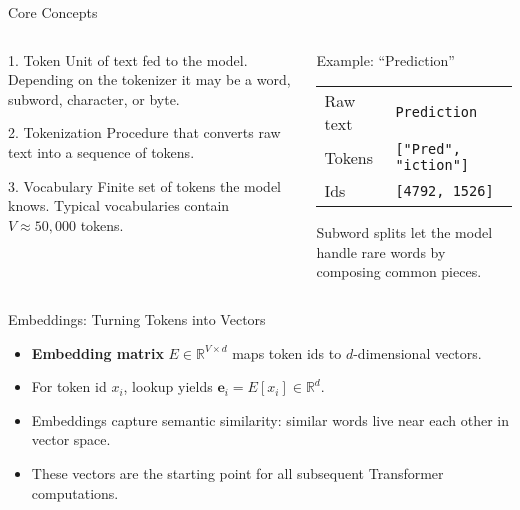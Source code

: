 \documentclass[aspectratio=169]{beamer}
\begin{document}
\begin{frame}{Core Concepts}
  \begin{columns}[T,onlytextwidth]
    \begin{column}{0.53\linewidth}
      \begin{block}{1. Token}
        Unit of text fed to the model. Depending on the tokenizer it may be a word, subword, character, or byte.
      \end{block}
      \begin{block}{2. Tokenization}
        Procedure that converts raw text into a sequence of tokens. 
      \end{block}
      \begin{block}{3. Vocabulary}
        Finite set of tokens the model knows. Typical vocabularies contain $V \approx 50{,}000$ tokens.
      \end{block}
    \end{column}
    \begin{column}{0.42\linewidth}
      \begin{exampleblock}{Example: ``Prediction''}
        \begin{tabular}{@{}ll@{}}
          Raw text & \texttt{Prediction} \\
          Tokens & \texttt{["Pred", "iction"]} \\
          Ids & \texttt{[4792, 1526]} \\
        \end{tabular}
        Subword splits let the model handle rare words by composing common pieces.
      \end{exampleblock}
    \end{column}
  \end{columns}
\end{frame}

\begin{frame}{Embeddings: Turning Tokens into Vectors}
  \begin{itemize}
    \item \textbf{Embedding matrix} $E \in \mathbb{R}^{V \times d}$ maps token ids to $d$-dimensional vectors.
    \item For token id $x_i$, lookup yields $\mathbf{e}_i = E[x_i] \in \mathbb{R}^d$.
    \item Embeddings capture semantic similarity: similar words live near each other in vector space.
    \item These vectors are the starting point for all subsequent Transformer computations.
  \end{itemize}
\end{frame}
\end{document}

